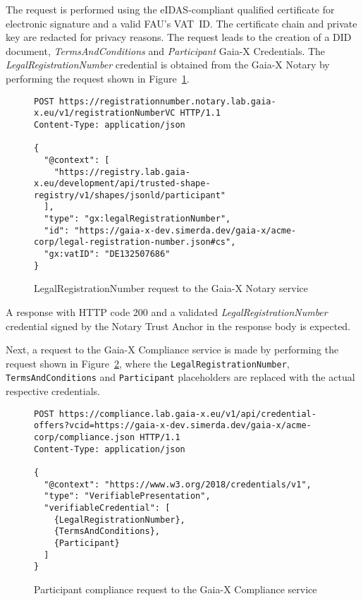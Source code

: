 The request is performed using the eIDAS-compliant qualified certificate for electronic signature and a valid FAU's VAT~ID.
The certificate chain and private key are redacted for privacy reasons.
The request leads to the creation of a DID document, \textit{TermsAndConditions} and \textit{Participant} Gaia-X Credentials.
The \textit{LegalRegistrationNumber} credential is obtained from the Gaia-X Notary by performing the request shown in Figure~\ref{fig:test_case_1_notary}.

\begin{figure}[h]
    \centering
    \begin{verbatim}
POST https://registrationnumber.notary.lab.gaia-x.eu/v1/registrationNumberVC HTTP/1.1
Content-Type: application/json

{
  "@context": [
    "https://registry.lab.gaia-x.eu/development/api/trusted-shape-registry/v1/shapes/jsonld/participant"
  ],
  "type": "gx:legalRegistrationNumber",
  "id": "https://gaia-x-dev.simerda.dev/gaia-x/acme-corp/legal-registration-number.json#cs",
  "gx:vatID": "DE132507686"
}
    \end{verbatim}
    \caption{LegalRegistrationNumber request to the Gaia-X Notary service}\label{fig:test_case_1_notary}
\end{figure}

A response with HTTP code 200 and a validated \textit{LegalRegistrationNumber} credential signed by the Notary Trust Anchor in the response body is expected.

Next, a request to the Gaia-X Compliance service is made by performing the request shown in Figure~\ref{fig:test_case_1_compliance}, where the \texttt{LegalRegistrationNumber}, \texttt{TermsAndConditions} and \texttt{Participant} placeholders are replaced with the actual respective credentials.

\begin{figure}[h]
    \centering
    \begin{verbatim}
POST https://compliance.lab.gaia-x.eu/v1/api/credential-offers?vcid=https://gaia-x-dev.simerda.dev/gaia-x/acme-corp/compliance.json HTTP/1.1
Content-Type: application/json

{
  "@context": "https://www.w3.org/2018/credentials/v1",
  "type": "VerifiablePresentation",
  "verifiableCredential": [
    {LegalRegistrationNumber},
    {TermsAndConditions},
    {Participant}
  ]
}
    \end{verbatim}
    \caption{Participant compliance request to the Gaia-X Compliance service}\label{fig:test_case_1_compliance}
\end{figure}


